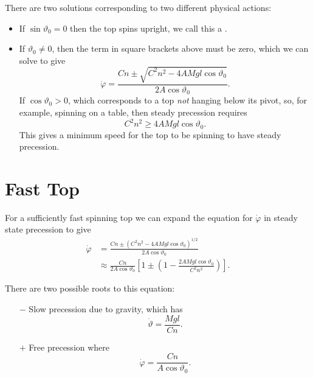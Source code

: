 \documentclass[fleqn]{NotesClass}
\begin{document}
    There are two solutions corresponding to two different physical actions:
    \begin{itemize}
        \item If \(\sin\vartheta_0 = 0\) then the top spins upright, we call this a .
        \item If \(\vartheta_0 \ne 0\), then the term in square brackets above must be zero, which we can solve to give
        \begin{equation}
            \dot{\varphi} = \frac{Cn \pm \sqrt{C^2n^2 - 4AMgl\cos\vartheta_0}}{2A\cos\vartheta_0}.
        \end{equation}
        If \(\cos\vartheta_0 > 0\), which corresponds to a top \emph{not} hanging below its pivot, so, for example, spinning on a table, then steady precession requires
        \begin{equation}
            C^2n^2 \ge 4AMgl\cos\vartheta_0.
        \end{equation}
        This gives a minimum speed for the top to be spinning to have steady precession.
    \end{itemize}
    
    \section{Fast Top}
    For a sufficiently fast spinning top we can expand the equation for \(\dot{\varphi}\) in steady state precession to give
    \begin{align}
        \dot{\varphi} &= \frac{Cn \pm (C^2n^2 - 4AMgl\cos\vartheta_0)^{1/2}}{2A\cos\vartheta_0}\\
        &\approx \frac{Cn}{2A\cos\vartheta_0} \left[ 1 \pm \left( 1 - \frac{2AMgl\cos\vartheta_0}{C^2n^2} \right) \right].
    \end{align}
    
    There are two possible roots to this equation:
    \begin{itemize}
        \item[\(-\)] Slow precession due to gravity, which has
        \begin{equation}
            \dot{\vartheta} = \frac{Mgl}{Cn}.
        \end{equation}
        \item[\(+\)] Free precession where
        \begin{equation}
            \dot{\varphi} = \frac{Cn}{A\cos\vartheta_0}.
        \end{equation}
    \end{itemize}
    
\end{document}
